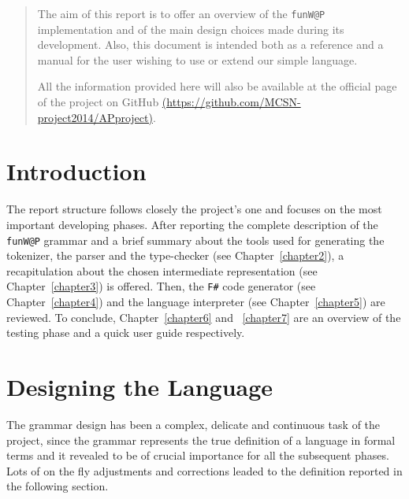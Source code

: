 \documentclass[]{final_report}
\begin{document}
\maketitle
\tableofcontents{}\newpage


\begin{abstract}

The aim of this report is to offer an overview of the \texttt{funW@P} implementation and of the main design choices made during its development. Also, this document is intended both as a reference and a manual for the user wishing to use or extend our simple language. 

All the information provided here will also be available at the official page of the project on GitHub \href{https://github.com/MCSN-project2014/APproject}{(https://github.com/MCSN-project2014/APproject)}.

\end{abstract}
\newpage



\chapter{Introduction}

The report structure follows closely the project's one and focuses on the most important developing phases. After reporting the complete description of the \texttt{funW@P} grammar and a brief summary about the tools used for generating the tokenizer, the parser and the type-checker (see Chapter~\ref{chapter2}), a recapitulation about the chosen intermediate representation (see Chapter~\ref{chapter3}) is offered. Then, the \texttt{F\#} code generator (see Chapter~\ref{chapter4}) and the language interpreter (see Chapter~\ref{chapter5}) are reviewed. To conclude, Chapter~\ref{chapter6} and ~\ref{chapter7} are an overview of the testing phase and a quick user guide respectively.

\chapter{\label{chapter2} Designing the Language}

The grammar design has been a complex, delicate and continuous task of the project, since the grammar represents the true definition of a language in formal terms and it revealed to be of crucial importance for all the subsequent phases. Lots of on the fly adjustments and corrections leaded to the definition reported in the following section.
\end{document}
